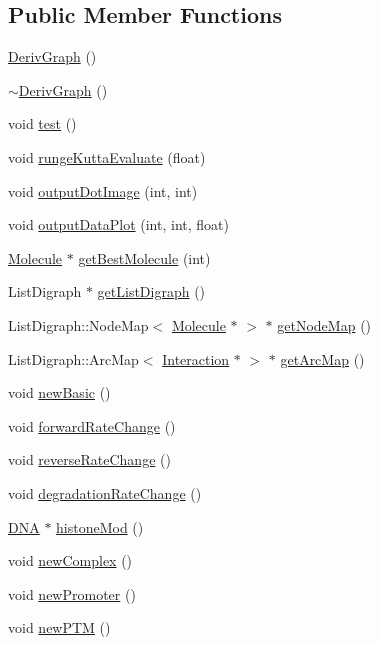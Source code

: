 \subsection*{Public Member Functions}
\begin{DoxyCompactItemize}
\item 
\hyperlink{classDerivGraph_af2a1f80b96b4657e7575748942d09947}{DerivGraph} ()
\item 
\hyperlink{classDerivGraph_a27b4fed56f8d2a745582622b7cb78b50}{$\sim$DerivGraph} ()
\item 
void \hyperlink{classDerivGraph_abf589f6aabe2c66bbe6f1aeb68ff4593}{test} ()
\item 
void \hyperlink{classDerivGraph_a61f768c0b7b8828b0ab129146801f628}{rungeKuttaEvaluate} (float)
\item 
void \hyperlink{classDerivGraph_a2e2ed79e21c6896a859cc7800d950809}{outputDotImage} (int, int)
\item 
void \hyperlink{classDerivGraph_ae435e564c1fa8370453c952b1ea5e9ab}{outputDataPlot} (int, int, float)
\item 
\hyperlink{classMolecule}{Molecule} $\ast$ \hyperlink{classDerivGraph_aaaa9598e55cbd8c55585a0488e940516}{getBestMolecule} (int)
\item 
ListDigraph $\ast$ \hyperlink{classDerivGraph_ae657edb3b0bf358f75f498a2d56e0456}{getListDigraph} ()
\item 
ListDigraph::NodeMap$<$ \hyperlink{classMolecule}{Molecule} $\ast$ $>$ $\ast$ \hyperlink{classDerivGraph_a41cea20de6fd631deeb82f036bc823f4}{getNodeMap} ()
\item 
ListDigraph::ArcMap$<$ \hyperlink{classInteraction}{Interaction} $\ast$ $>$ $\ast$ \hyperlink{classDerivGraph_a5ff2dac34f1cdcc4b4abfc26f13da1ab}{getArcMap} ()
\item 
void \hyperlink{classDerivGraph_a8862d4f9ebbd3eced9d56a81fe91c4fb}{newBasic} ()
\item 
void \hyperlink{classDerivGraph_afbda567a3f51d05fad37eb46fc121a89}{forwardRateChange} ()
\item 
void \hyperlink{classDerivGraph_aae8c58e1d6be852efbe1ed6593f31eca}{reverseRateChange} ()
\item 
void \hyperlink{classDerivGraph_a038841806aa1fe80a9450f977baa1fd2}{degradationRateChange} ()
\item 
\hyperlink{classDNA}{DNA} $\ast$ \hyperlink{classDerivGraph_ae39d9acba4901f668d8a85c88bfcc21a}{histoneMod} ()
\item 
void \hyperlink{classDerivGraph_a4be722e989002430ca7c363dce500638}{newComplex} ()
\item 
void \hyperlink{classDerivGraph_aa55a36103c33d4f1bd57de797bcd45cb}{newPromoter} ()
\item 
void \hyperlink{classDerivGraph_a83937a5c3ed427ebaad2bf23260c0352}{newPTM} ()
\end{DoxyCompactItemize}
